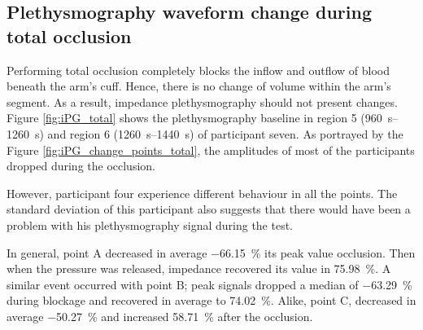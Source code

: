 \subsection{Plethysmography waveform change during total occlusion}
\label{section5.3.3}
Performing total occlusion completely blocks the inflow and outflow of blood beneath the arm's cuff.  Hence, there is no change of volume within the arm's segment. As a result, impedance plethysmography should not present changes.  Figure \ref{fig:iPG_total} shows the plethysmography baseline in region 5 (\SIrange{960}{1260}{\second}) and region 6  (\SIrange{1260}{1440}{\second}) of participant seven. As portrayed by the Figure \ref{fig:iPG_change_points_total}, the amplitudes of most of the participants dropped during the occlusion.

However, participant four experience different behaviour in all the points. The standard deviation of this participant also suggests that there would have been a problem with his plethysmography signal during the test. 

In general, point A decreased in average \SI{-66.15}{\percent} its peak value occlusion. Then when the pressure was released, impedance recovered its value in \SI{75.98}{\percent}. A similar event occurred with point B; peak signals dropped a median of \SI{-63.29}{\percent} during blockage and recovered in average to \SI{74.02}{\percent}. Alike, point C, decreased in average \SI{-50.27}{\percent}  and increased \SI{58.71}{\percent} after the occlusion.

